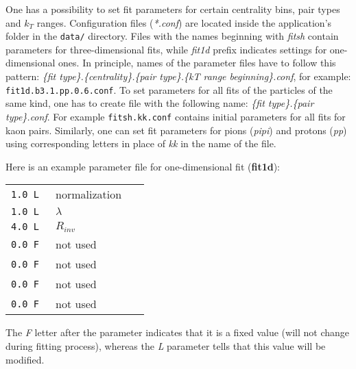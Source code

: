       One has a possibility to set fit parameters for certain centrality bins, pair types and $k_T$ ranges.
      Configuration files (\textit{*.conf}) are located inside the application's folder in the \verb|data/| directory.
      Files with the names beginning with \textit{fitsh} contain parameters for three-dimensional fits, while \textit{fit1d} prefix indicates settings for one-dimensional ones.
      In principle, names of the parameter files have to follow this pattern: \textit{\{fit type\}.\{centrality\}.\{pair type\}.\{kT range beginning\}.conf}, for example: \verb|fit1d.b3.1.pp.0.6.conf|.
      To set parameters for all fits of the particles of the same kind, one has to create file with the following name: \textit{\{fit type\}.\{pair type\}.conf}. For example \verb|fitsh.kk.conf| contains initial parameters for all fits for kaon pairs.
      Similarly, one can set fit parameters for pions (\textit{pipi}) and protons (\textit{pp}) using corresponding letters in place of \textit{kk} in the name of the file.


      Here is an example parameter file for one-dimensional fit (\textbf{fit1d}):
      \begin{longtable}{p{0.2\linewidth}p{0.2\linewidth}}
        \verb|1.0 L|   & normalization\\
        \verb|1.0 L|   & $\lambda$\\
        \verb|4.0 L|   & $R_{inv}$\\
        \verb|0.0 F|   & not used \\
        \verb|0.0 F|   & not used \\
        \verb|0.0 F|   & not used \\
        \verb|0.0 F|   & not used \\
      \end{longtable}
      The \textit{F} letter after the parameter indicates that it is a fixed value (will not change during fitting process), whereas the \textit{L} parameter tells that this value will be modified.

